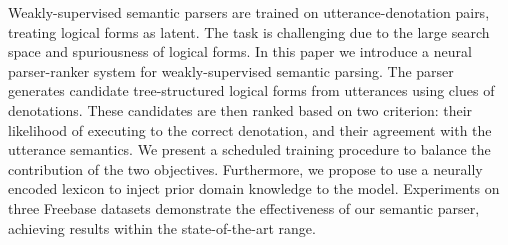 Weakly-supervised semantic parsers are trained on utterance-denotation pairs, treating logical forms as latent.  The task is challenging due to the large search space and spuriousness of logical forms. In this paper we introduce a neural parser-ranker system for weakly-supervised semantic parsing. The parser generates candidate tree-structured logical forms from utterances using clues of denotations. These candidates are then ranked based on two criterion: their likelihood of executing to the correct denotation, and their agreement with the utterance semantics. We present a scheduled training procedure to balance the contribution of the two objectives. Furthermore, we propose to use a neurally encoded lexicon to inject prior domain knowledge to the model. Experiments on three Freebase datasets demonstrate the effectiveness of our semantic parser, achieving results within the state-of-the-art range.
